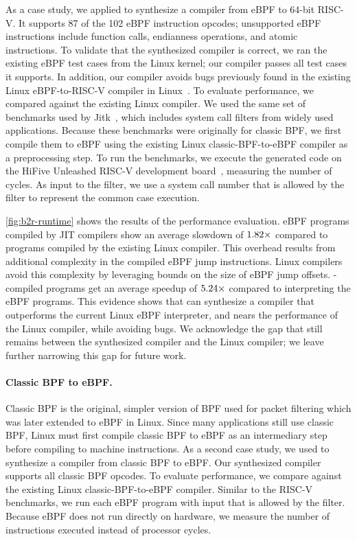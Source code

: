 As a case study, we applied \jitsynth to synthesize
a compiler from eBPF to 64-bit RISC-V.
%
It supports 87 of the 102 eBPF instruction opcodes;
unsupported eBPF instructions include function calls,
endianness operations, and atomic instructions.
%
To validate that the synthesized compiler is correct, we ran the existing
eBPF test cases from the Linux kernel; our compiler passes all test cases
it supports. %
%
In addition, our compiler avoids bugs previously found in the existing
Linux eBPF-to-RISC-V compiler in Linux~\cite{nelson:bpf-riscv-add32-bug}.
%
To evaluate performance, we compared against the existing Linux compiler.
%
We used the same set of benchmarks used by Jitk~\cite{wang:jitk},
which includes system call filters from widely used applications.
%
Because these benchmarks were originally for classic BPF,
we first compile them to eBPF using the existing
Linux classic-BPF-to-eBPF compiler as a preprocessing step.
%
To run the benchmarks, we execute the generated
code on the HiFive Unleashed RISC-V development board~\cite{sifive:fu540-c000}, measuring
the number of cycles.
%
As input to the filter, we use a system call number that is allowed
by the filter to represent the common case execution.


\autoref{fig:b2r-runtime} shows the results of the performance evaluation.
%
eBPF programs compiled by \jitsynth JIT compilers show an average slowdown of $1.82\times$
compared to programs compiled by the existing Linux compiler.
%
This overhead results from additional complexity in the compiled eBPF jump instructions.
%
Linux compilers avoid this complexity by leveraging
bounds on the size of eBPF jump offsets.
%
\jitsynth-compiled programs get an average speedup of $5.24\times$
compared to interpreting the eBPF programs.
%
This evidence shows that \jitsynth can synthesize a compiler that outperforms
the current Linux eBPF interpreter, and nears the performance of the Linux
compiler, while avoiding bugs.
We acknowledge the gap that still remains between the synthesized compiler
and the Linux compiler; we leave further narrowing this gap for future work.
%

\paragraph{Classic BPF to eBPF.}

Classic BPF is the original, simpler version of BPF used for packet filtering which
was later extended to eBPF in Linux.
%
Since many applications still use classic BPF, Linux must first compile classic BPF
to eBPF as an intermediary step before compiling to machine instructions.
%
As a second case study, we used \jitsynth to synthesize a compiler from classic BPF to eBPF.
%
Our synthesized compiler supports all classic BPF opcodes.
%
To evaluate performance, we compare against the existing
Linux classic-BPF-to-eBPF compiler.
%
Similar to the RISC-V benchmarks, we run each eBPF program
with input that is allowed by the filter.
%
Because eBPF does not run directly on hardware, we measure
the number of instructions executed instead of processor cycles.


